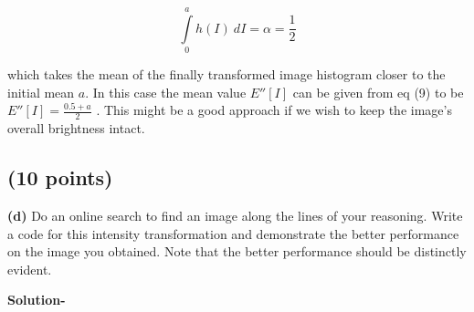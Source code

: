 \documentclass{article}
\begin{document}
\begin{equation}\int\limits_0^a h(I)\ dI = \alpha = \frac{1}{2}\end{equation}

which takes the mean of the finally transformed image histogram closer
to the initial mean $ a $. In this case the mean value $E''[I]$ can be given from eq (9) to be  $ E''[I] = \frac{0.5+a}{2} $ . This might be a good approach if we wish to keep the image’s overall
brightness intact.

\subsection{(10 points)}
\textbf{(d)} Do an online search to find an image along the lines of your reasoning.
Write a code for this intensity transformation and demonstrate the better
performance on the image you obtained. Note that the better performance
should be distinctly evident.

\textbf{Solution-}
\end{document}
